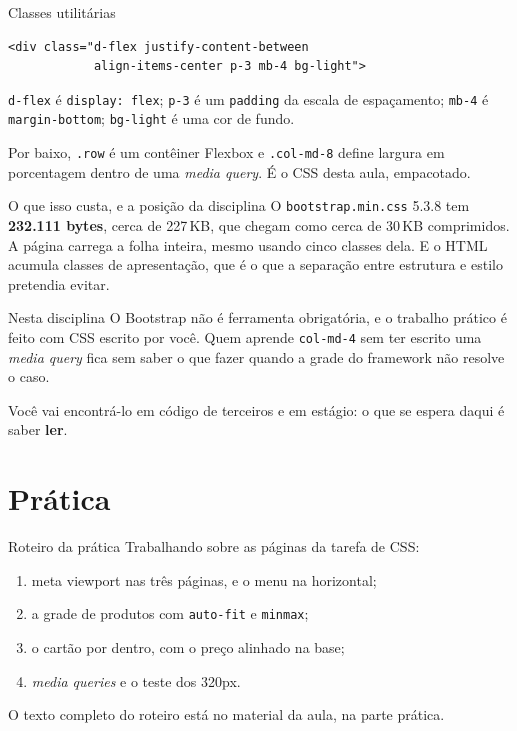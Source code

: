 \documentclass{beamer}
\begin{document}
\begin{frame}[fragile]{Classes utilitárias}
	\begin{verbatim}
<div class="d-flex justify-content-between
            align-items-center p-3 mb-4 bg-light">
  \end{verbatim}

	\vspace{0.3cm}
	\texttt{d-flex} é \texttt{display: flex}; \texttt{p-3} é um \texttt{padding}
	da escala de espaçamento; \texttt{mb-4} é \texttt{margin-bottom};
	\texttt{bg-light} é uma cor de fundo.

	\vspace{0.3cm}
	Por baixo, \texttt{.row} é um contêiner Flexbox e \texttt{.col-md-8} define
	largura em porcentagem dentro de uma \emph{media query}. É o CSS desta aula,
	empacotado.
\end{frame}

\begin{frame}{O que isso custa, e a posição da disciplina}
	O \texttt{bootstrap.min.css} 5.3.8 tem \textbf{232.111 bytes}, cerca de
	227\,KB, que chegam como cerca de 30\,KB comprimidos. A página carrega a folha
	inteira, mesmo usando cinco classes dela. E o HTML acumula classes de
	apresentação, que é o que a separação entre estrutura e estilo pretendia
	evitar.

	\vspace{0.4cm}
	\begin{block}{Nesta disciplina}
		O Bootstrap não é ferramenta obrigatória, e o trabalho prático é feito com
		CSS escrito por você. Quem aprende \texttt{col-md-4} sem ter escrito uma
		\emph{media query} fica sem saber o que fazer quando a grade do framework
		não resolve o caso.

		Você vai encontrá-lo em código de terceiros e em estágio: o que se espera
		daqui é saber \textbf{ler}.
	\end{block}
\end{frame}

\section{Prática}

\begin{frame}{Roteiro da prática}
	Trabalhando sobre as páginas da tarefa de CSS:

	\begin{enumerate}
		\item meta viewport nas três páginas, e o menu na horizontal;
		\item a grade de produtos com \texttt{auto-fit} e \texttt{minmax};
		\item o cartão por dentro, com o preço alinhado na base;
		\item \emph{media queries} e o teste dos 320px.
	\end{enumerate}

	\vspace{0.4cm}
	O texto completo do roteiro está no material da aula, na parte prática.
\end{frame}
\end{document}
